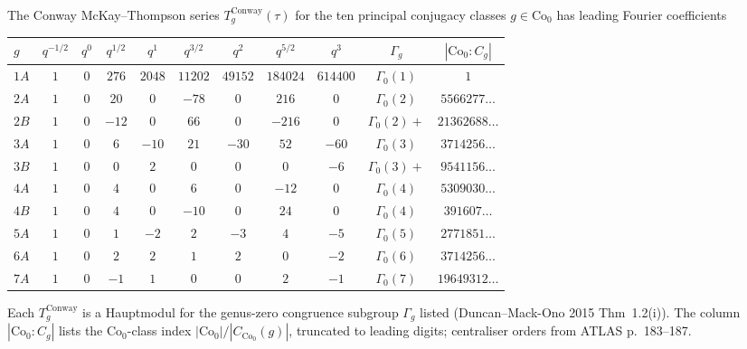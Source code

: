 \begin{theorem}%
\label{thm:bkm-conway-ten-class-table}%
%
The Conway McKay--Thompson series $T_g^{\mathrm{Conway}}(\tau)$ for the
ten principal conjugacy classes $g \in \mathrm{Co}_0$ has leading
Fourier coefficients
\begin{center}
\renewcommand{\arraystretch}{1.12}
\begin{tabular}{l|cccccccc|cc}
\toprule
$g$ & $q^{-1/2}$ & $q^{0}$ & $q^{1/2}$ & $q^{1}$ & $q^{3/2}$ & $q^{2}$ &
 $q^{5/2}$ & $q^{3}$ & $\Gamma_g$ & $|\mathrm{Co}_0 : C_g|$ \\
\midrule
$1A$ & $1$ & $0$ & $276$ & $2048$ & $11202$ & $49152$ & $184024$ & $614400$ & $\Gamma_0(1)$ & $1$ \\
$2A$ & $1$ & $0$ & $20$ & $0$ & $-78$ & $0$ & $216$ & $0$ & $\Gamma_0(2)$ & $5566277\ldots$ \\
$2B$ & $1$ & $0$ & $-12$ & $0$ & $66$ & $0$ & $-216$ & $0$ & $\Gamma_0(2)+$ & $21362688\ldots$ \\
$3A$ & $1$ & $0$ & $6$ & $-10$ & $21$ & $-30$ & $52$ & $-60$ & $\Gamma_0(3)$ & $3714256\ldots$ \\
$3B$ & $1$ & $0$ & $0$ & $2$ & $0$ & $0$ & $0$ & $-6$ & $\Gamma_0(3)+$ & $9541156\ldots$ \\
$4A$ & $1$ & $0$ & $4$ & $0$ & $6$ & $0$ & $-12$ & $0$ & $\Gamma_0(4)$ & $5309030\ldots$ \\
$4B$ & $1$ & $0$ & $4$ & $0$ & $-10$ & $0$ & $24$ & $0$ & $\Gamma_0(4)$ & $391607\ldots$ \\
$5A$ & $1$ & $0$ & $1$ & $-2$ & $2$ & $-3$ & $4$ & $-5$ & $\Gamma_0(5)$ & $2771851\ldots$ \\
$6A$ & $1$ & $0$ & $2$ & $2$ & $1$ & $2$ & $0$ & $-2$ & $\Gamma_0(6)$ & $3714256\ldots$ \\
$7A$ & $1$ & $0$ & $-1$ & $1$ & $0$ & $0$ & $2$ & $-1$ & $\Gamma_0(7)$ & $19649312\ldots$ \\
\bottomrule
\end{tabular}
\end{center}
Each $T_g^{\mathrm{Conway}}$ is a Hauptmodul for the genus-zero
congruence subgroup $\Gamma_g$ listed (Duncan--Mack-Ono 2015
Thm~1.2(i)). The column $|\mathrm{Co}_0 : C_g|$ lists the
$\mathrm{Co}_0$-class index $|{\mathrm{Co}_0}|/|C_{\mathrm{Co}_0}(g)|$,
truncated to leading digits; centraliser orders from ATLAS
\cite{ConwayCurtisNortonParkerWilson1985} p.~183--187.
\end{theorem}

